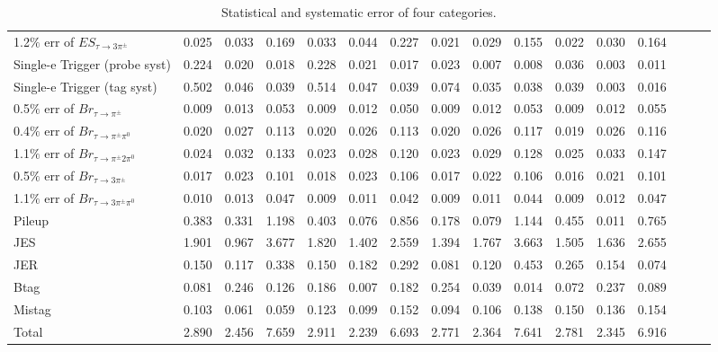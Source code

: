 \begin{sidewaystable}[p]
\begin{tabular}{|l|ccc|ccc|ccc|ccc|ccc|}
  1.2$\%$ err of $ES_{\tau\to3\pi^\pm}$      & 0.025 & 0.033 & 0.169 & 0.033 & 0.044 & 0.227 & 0.021 & 0.029 & 0.155 & 0.022 & 0.030 & 0.164 \\ 
  Single-e Trigger (probe syst)              & 0.224 & 0.020 & 0.018 & 0.228 & 0.021 & 0.017 & 0.023 & 0.007 & 0.008 & 0.036 & 0.003 & 0.011 \\ 
  Single-e Trigger (tag syst)                & 0.502 & 0.046 & 0.039 & 0.514 & 0.047 & 0.039 & 0.074 & 0.035 & 0.038 & 0.039 & 0.003 & 0.016 \\ 
  0.5$\%$ err of $Br_{\tau\to\pi^\pm}$       & 0.009 & 0.013 & 0.053 & 0.009 & 0.012 & 0.050 & 0.009 & 0.012 & 0.053 & 0.009 & 0.012 & 0.055 \\ 
  0.4$\%$ err of $Br_{\tau\to\pi^\pm\pi^0}$  & 0.020 & 0.027 & 0.113 & 0.020 & 0.026 & 0.113 & 0.020 & 0.026 & 0.117 & 0.019 & 0.026 & 0.116 \\ 
  1.1$\%$ err of $Br_{\tau\to\pi^\pm2\pi^0}$ & 0.024 & 0.032 & 0.133 & 0.023 & 0.028 & 0.120 & 0.023 & 0.029 & 0.128 & 0.025 & 0.033 & 0.147 \\ 
  0.5$\%$ err of $Br_{\tau\to3\pi^\pm}$      & 0.017 & 0.023 & 0.101 & 0.018 & 0.023 & 0.106 & 0.017 & 0.022 & 0.106 & 0.016 & 0.021 & 0.101 \\ 
  1.1$\%$ err of $Br_{\tau\to3\pi^\pm\pi^0}$ & 0.010 & 0.013 & 0.047 & 0.009 & 0.011 & 0.042 & 0.009 & 0.011 & 0.044 & 0.009 & 0.012 & 0.047 \\ 
  Pileup                                     & 0.383 & 0.331 & 1.198 & 0.403 & 0.076 & 0.856 & 0.178 & 0.079 & 1.144 & 0.455 & 0.011 & 0.765 \\ 
  JES                                        & 1.901 & 0.967 & 3.677 & 1.820 & 1.402 & 2.559 & 1.394 & 1.767 & 3.663 & 1.505 & 1.636 & 2.655 \\ 
  JER                                        & 0.150 & 0.117 & 0.338 & 0.150 & 0.182 & 0.292 & 0.081 & 0.120 & 0.453 & 0.265 & 0.154 & 0.074 \\ 
  Btag                                       & 0.081 & 0.246 & 0.126 & 0.186 & 0.007 & 0.182 & 0.254 & 0.039 & 0.014 & 0.072 & 0.237 & 0.089 \\ 
  Mistag                                     & 0.103 & 0.061 & 0.059 & 0.123 & 0.099 & 0.152 & 0.094 & 0.106 & 0.138 & 0.150 & 0.136 & 0.154 \\ 
  \hline
  Total                                      & 2.890 & 2.456 & 7.659 & 2.911 & 2.239 & 6.693 & 2.771 & 2.364 & 7.641 & 2.781 & 2.345 & 6.916 \\ 
  \hline
  \end{tabular}
  \caption{ Statistical and systematic error of four categories. }
  \label{tab:syst_alt}
\end{sidewaystable}
